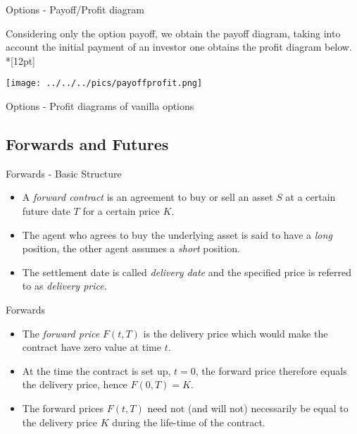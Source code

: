 {Options - Payoff/Profit diagram }

Considering only the option payoff, we obtain the payoff diagram, taking into account the initial payment of an investor one obtains the profit diagram below.\\*[12pt]

\begin{center}
\texttt{[image: ../../../pics/payoffprofit.png]}
\end{center}

{Options - Profit diagrams of vanilla options}
\begin{figure}
  \centering
   \qquad
\end{figure}

\subsection{Forwards and Futures}

{Forwards - Basic Structure}

\begin{itemize}
\item<1->
A {\it forward contract}
is an agreement to buy or sell an asset $S$ at a certain future
date $T$ for a certain price $K$.
\item<2->
The agent who agrees to
buy the underlying asset is said to have a {\it long} position,
the other agent assumes a {\it short} position.
\item<3-> The settlement
date is called {\it delivery date} and the specified price is
referred to as {\it delivery price}.
\end{itemize}

{Forwards}
\begin{itemize}
\item<1-> The {\it forward
price} $F(t,T)$ is the delivery price which would make the
contract have zero value at time $t$.
\item<2-> At the time the contract is set up, $t=0$,
the forward price therefore equals the delivery price, hence
$F(0,T) = K$.
\item<3->
The forward prices $F(t,T)$ need not (and will not)
necessarily be equal to the delivery price $K$ during the
life-time of the contract.
\end{itemize}

